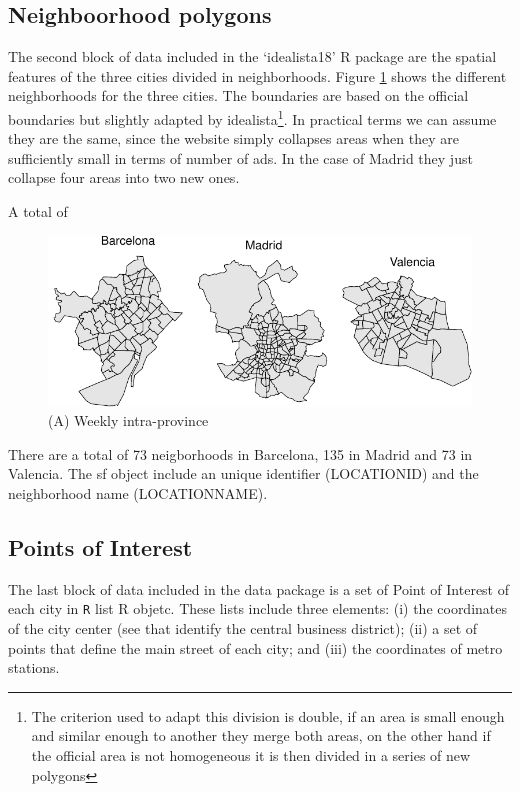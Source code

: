\documentclass[Royal,times,sageh]{sagej}
\begin{document}
\hypertarget{neighboorhood-polygons}{%
\subsection{Neighboorhood polygons}\label{neighboorhood-polygons}}

The second block of data included in the `idealista18' R package are the
spatial features of the three cities divided in neighborhoods. Figure
\ref{fig:all-polygons} shows the different neighborhoods for the three
cities. The boundaries are based on the official boundaries but slightly
adapted by
idealista\footnote{The criterion used to adapt this division is double, if an area is small enough and similar enough to another they merge both areas, on the other hand if the official area is not homogeneous it is then divided in a series of new polygons}.
In practical terms we can assume they are the same, since the website
simply collapses areas when they are sufficiently small in terms of
number of ads. In the case of Madrid they just collapse four areas into
two new ones.

A total of

\begin{figure}
\centering
\includegraphics{EPB_files/figure-latex/unnamed-chunk-1-1.pdf}
\caption{\label{fig:all-polygons} (A) Weekly intra-province}
\end{figure}

There are a total of 73 neigborhoods in Barcelona, 135 in Madrid and 73
in Valencia. The sf object include an unique identifier (LOCATIONID) and
the neighborhood name (LOCATIONNAME).

\hypertarget{points-of-interest}{%
\subsection{Points of Interest}\label{points-of-interest}}

The last block of data included in the data package is a set of Point of
Interest of each city in \texttt{R} list R objetc. These lists include
three elements: (i) the coordinates of the city center (see that
identify the central business district); (ii) a set of points that
define the main street of each city; and (iii) the coordinates of metro
stations.
\end{document}
